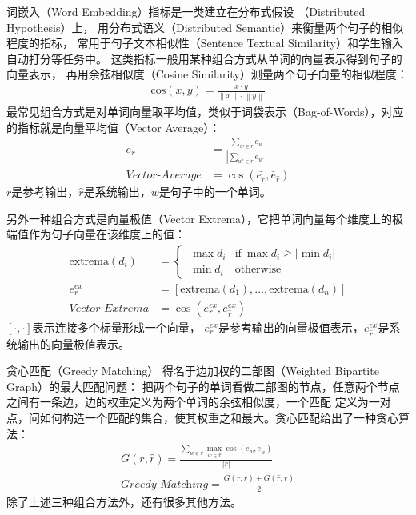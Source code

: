 词嵌入（Word Embedding）指标是一类建立在分布式假设
（Distributed Hypothesis）上，
用分布式语义（Distributed Semantic）来衡量两个句子的相似程度的指标，
常用于句子文本相似性（Sentence Textual Similarity）和学生输入自动打分等任务中。
这类指标一般用某种组合方式从单词的向量表示得到句子的向量表示，
再用余弦相似度（Cosine Similarity）测量两个句子向量的相似程度：
\begin{align}
    \text{cos}(x, y) = \frac{x\cdot y}
    {\left\| x \right\| \cdot \left\| y \right\|}
\end{align}
最常见组合方式是对单词向量取平均值，类似于词袋表示（Bag-of-Words），对应的指标就是向量平均值（Vector Average）：
\begin{align}
    \bar{e_r} &= \frac{\sum_{w \in r} e_w}{|\sum_{w' \in r} e_{w'}|} \\
    \textit{Vector-Average} &= \cos(\bar{e_r}, \bar{e}_{\hat{r}})
\end{align}
$r$是参考输出，$\hat{r}$是系统输出，$w$是句子中的一个单词。

另外一种组合方式是向量极值（Vector Extrema），它把单词向量每个维度上的极端值作为句子向量在该维度上的值：
\begin{align}
    \text{extrema}(d_i) &=
    \begin{cases}
        \ \max d_i & \text{if}\ \max d_i \geq |\min d_i| \\
        \ \min d_i & \text{otherwise}
    \end{cases} \\
    e_r^{ex} &= [\text{extrema}(d_1), \dots, \text{extrema}(d_n)] \\
    \textit{Vector-Extrema} &= \cos( e_r^{ex}, e_{\hat{r}}^{ex} )
\end{align}
$[\cdot, \cdot]$表示连接多个标量形成一个向量，
$e_r^{ex}$是参考输出的向量极值表示，$e_{\hat{r}}^{ex}$是系统输出的向量极值表示。

贪心匹配（Greedy Matching）
得名于边加权的二部图（Weighted Bipartite Graph）的最大匹配问题：
把两个句子的单词看做二部图的节点，任意两个节点之间有一条边，边的权重定义为两个单词的余弦相似度，一个匹配
定义为一对点，问如何构造一个匹配的集合，使其权重之和最大。贪心匹配给出了一种贪心算法：
\begin{align}
    G(r, \hat{r}) = \frac{
    \sum_{w \in r} \max_{\hat{w} \in \hat{r}} \cos(e_w, e_{\hat{w}})
    }{ |r| } \\
    \textit{Greedy-Matching} = \frac{
    G(r, \hat{r}) + G(\hat{r}, r)
    }{2}
\end{align}
除了上述三种组合方法外，还有很多其他方法。

